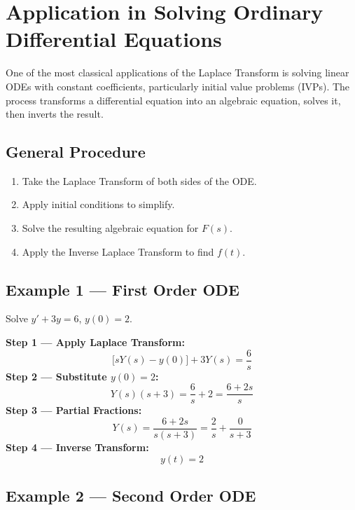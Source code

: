 \documentclass[12pt]{article}
\begin{document}
\newpage

\section{Application in Solving Ordinary Differential Equations}

One of the most classical applications of the Laplace Transform is solving linear ODEs with constant
coefficients, particularly initial value problems (IVPs). The process transforms a differential
equation into an algebraic equation, solves it, then inverts the result.

\subsection*{General Procedure}

\begin{enumerate}[noitemsep]
  \item Take the Laplace Transform of both sides of the ODE.
  \item Apply initial conditions to simplify.
  \item Solve the resulting algebraic equation for $F(s)$.
  \item Apply the Inverse Laplace Transform to find $f(t)$.
\end{enumerate}

\subsection*{Example 1 --- First Order ODE}

\begin{examplebox}
Solve $y' + 3y = 6$, \quad $y(0) = 2$.

\medskip
\textbf{Step 1 --- Apply Laplace Transform:}
\[
  \bigl[sY(s) - y(0)\bigr] + 3Y(s) = \frac{6}{s}
\]
\textbf{Step 2 --- Substitute $y(0) = 2$:}
\[
  Y(s)(s+3) = \frac{6}{s} + 2 = \frac{6+2s}{s}
\]
\textbf{Step 3 --- Partial Fractions:}
\[
  Y(s) = \frac{6+2s}{s(s+3)} = \frac{2}{s} + \frac{0}{s+3}
\]
\textbf{Step 4 --- Inverse Transform:}
\[
  \boxed{y(t) = 2}
\]
\end{examplebox}

\subsection*{Example 2 --- Second Order ODE}
\end{document}
